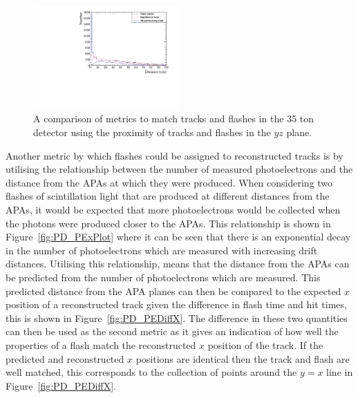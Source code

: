 \begin{figure}[h!]
  \centering
  \includegraphics[width=0.5\textwidth]{DiffTrackSeps}
  \caption[Matching tracks and flashes in the 35 ton using positions in the $yz$ plane]
          {A comparison of metrics to match tracks and flashes in the 35 ton detector using the proximity of tracks and flashes in the $yz$ plane.}
  \label{fig:PDYZDist}
\end{figure}

Another metric by which flashes could be assigned to reconstructed tracks is by utilising the relationship between the number of measured photoelectrons and the distance from the APAs at which they were produced. When considering two flashes of scintillation light that are produced at different distances from the APAs, it would be expected that more photoelectrons would be collected when the photons were produced closer to the APAs. This relationship is shown in Figure~\ref{fig:PD_PExPlot} where it can be seen that there is an exponential decay in the number of photoelectrons which are measured with increasing drift distances. Utilising this relationship, means that the distance from the APAs can be predicted from the number of photoelectrons which are measured. This predicted distance from the APA planes can then be compared to the expected $x$ position of a reconstructed track given the difference in flash time and hit times, this is shown in Figure~\ref{fig:PD_PEDiffX}. The difference in these two quantities can then be used as the second metric as it gives an indication of how well the properties of a flash match the reconstructed $x$ position of the track. If the predicted and reconstructed $x$ positions are identical then the track and flash are well matched, this corresponds to the collection of points around the $y=x$ line in Figure~\ref{fig:PD_PEDiffX}. \\

